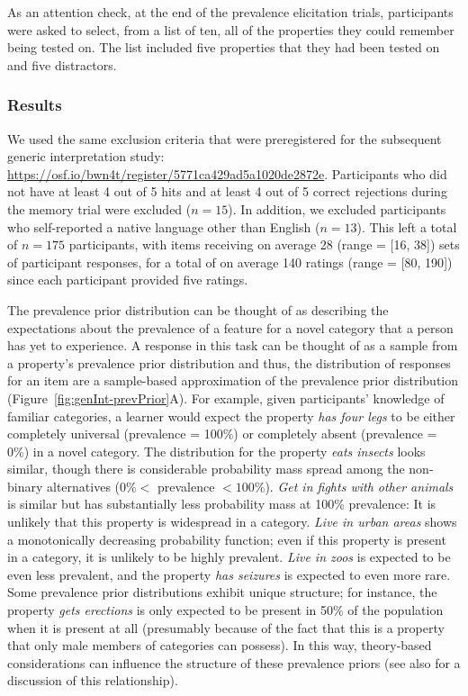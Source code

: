 \documentclass[floatsintext,doc]{apa6}
\begin{document}
As an attention check, at the end of the prevalence elicitation trials, participants were asked to select, from a list of ten, all of the properties they could remember being tested on.
The list included five properties that they had been tested on and five distractors.

\hypertarget{results}{%
\subsubsection{Results}\label{results}}
We used the same exclusion criteria that were preregistered for the subsequent generic interpretation study: \url{https://osf.io/bwn4t/register/5771ca429ad5a1020de2872e}.
Participants who did not have at least 4 out of 5 hits and at least 4 out of 5 correct rejections during the memory trial were excluded (\(n = 15\)).
In addition, we excluded participants who self-reported a native language other than English (\(n = 13\)).
This left a total of \(n = 175\) participants, with items receiving on average 28 (range = {[}16, 38{]}) sets of participant responses, for a total of on average 140 ratings (range = {[}80, 190{]}) since each participant provided five ratings.

The prevalence prior distribution can be thought of as describing the expectations about the prevalence of a feature for a novel category that a person has yet to experience. 
A response in this task can be thought of as a sample from a property's prevalence prior distribution and thus, the distribution of responses for an item are a sample-based approximation of the prevalence prior distribution (Figure~\ref{fig:genInt-prevPrior}A). 
For example, given participants' knowledge of familiar categories, a learner would expect the property \emph{has four legs} to be either completely universal (prevalence = 100\%) or completely absent (prevalence = 0\%) in a novel category.
The distribution for the property \emph{eats insects} looks similar, though there is considerable probability mass spread among the non-binary alternatives (\(0\% <\) prevalence \(< 100\%\)).
\emph{Get in fights with other animals} is similar but has substantially less probability mass at 100\% prevalence: It is unlikely that this property is widespread in a category.
\emph{Live in urban areas} shows a monotonically decreasing probability function; even if this property is present in a category, it is unlikely to be highly prevalent. 
\emph{Live in zoos} is expected to be even less prevalent, and the property \emph{has seizures} is expected to even more rare.
Some prevalence prior distributions exhibit unique structure; for instance,  the property \emph{gets erections} is only expected to be present in 50\% of the population when it is present at all (presumably because of the fact that this is a property that only male members of categories can possess). In this way, theory-based considerations can influence the structure of these prevalence priors (see also  for a discussion of this relationship). 
\end{document}
